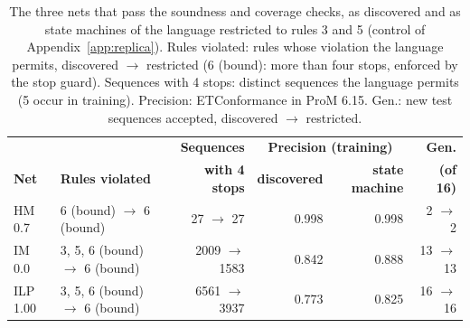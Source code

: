 \begin{table}[htbp]
\centering
\footnotesize
\setlength{\tabcolsep}{3pt}
\begin{tabular}{llrrrr}
\toprule
 & & \textbf{Sequences} & \multicolumn{2}{c}{\textbf{Precision (training)}} & \textbf{Gen.} \\
\textbf{Net} & \textbf{Rules violated} & \textbf{with 4 stops} & \textbf{discovered} & \textbf{state machine} & \textbf{(of 16)} \\
\midrule
HM 0.7 & 6 (bound) $\rightarrow$ 6 (bound) & 27 $\rightarrow$ 27 & 0.998 & 0.998 & 2 $\rightarrow$ 2 \\
IM 0.0 & 3, 5, 6 (bound) $\rightarrow$ 6 (bound) & 2009 $\rightarrow$ 1583 & 0.842 & 0.888 & 13 $\rightarrow$ 13 \\
ILP 1.00 & 3, 5, 6 (bound) $\rightarrow$ 6 (bound) & 6561 $\rightarrow$ 3937 & 0.773 & 0.825 & 16 $\rightarrow$ 16 \\
\bottomrule
\end{tabular}
\caption{The three nets that pass the soundness and coverage checks, as discovered and as state machines of the language restricted to rules 3 and 5 (control of Appendix~\ref{app:replica}). Rules violated: rules whose violation the language permits, discovered $\rightarrow$ restricted (6 (bound): more than four stops, enforced by the stop guard). Sequences with 4 stops: distinct sequences the language permits (5 occur in training). Precision: ETConformance in ProM 6.15. Gen.: new test sequences accepted, discovered $\rightarrow$ restricted.}
\label{tab:app_rewritten_funnel}
\end{table}
